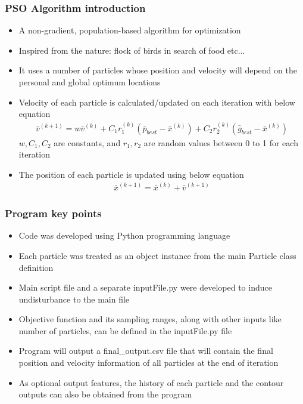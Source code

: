 
\begin{frame}
    \frametitle{PSO Algorithm introduction}
    \begin{itemize}
        \item A non-gradient, population-based algorithm for optimization
        \item Inspired from the nature: flock of birds in search of food etc...
        \item It uses a number of particles whose position and velocity will
            depend on the personal and global optimum locations
        \item Velocity of each particle is calculated/updated on each iteration
            with below equation
            \begin{align*}
                \bar{v}^{(k+1)} = w \bar{v}^{(k)} + C_1 r_1^{(k)} \left(\bar{p}_{best} - \bar{x}^{(k)}\right) + C_2 r_2^{(k)} \left(\bar{g}_{best} - \bar{x}^{(k)}\right)
            \end{align*}
            \(w,C_1,C_2\) are constants, and \(r_1,r_2\) are random values between 0 to 1 for each iteration
        \item The position of each particle is updated using below equation
            \begin{align*}
             \bar{x}^{(k+1)} = \bar{x}^{(k)} + \bar{v}^{(k+1)}
            \end{align*}
    \end{itemize}
\end{frame}


\begin{frame}
    \frametitle{Program key points}
    \begin{itemize}
        \item Code was developed using Python programming language
        \item Each particle was treated as an object instance from the main
            Particle class definition
        \item Main script file and a separate inputFile.py were developed to
            induce undisturbance to the main file
        \item Objective function and its sampling ranges, along with other inputs
            like number of particles, can be defined in the inputFile.py file
        \item Program will output a final\_output.csv file that will contain
            the final position and velocity information of all particles at
            the end of iteration
        \item As optional output features, the history of each particle and
            the contour outputs can also be obtained from the program
    \end{itemize}
\end{frame}

